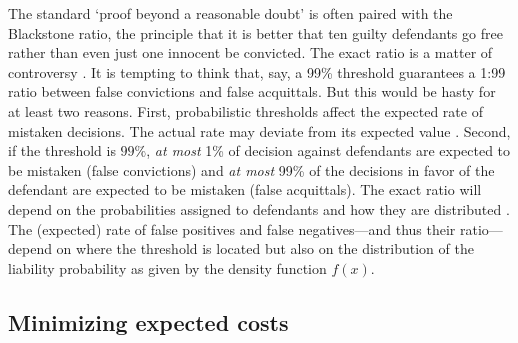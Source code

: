 \documentclass{article}
\begin{document}
 The standard
`proof beyond a reasonable doubt' is often paired with the Blackstone ratio, the principle that it is better that ten guilty defendants go free rather than even just one innocent be convicted. The exact ratio is a matter of controversy \citep{voloch1997}.
It is tempting to think that, say, a 99\% threshold guarantees a 1:99 ratio between false convictions and false acquittals. But this would be hasty for at least two reasons.
First, probabilistic thresholds affect the expected rate of mistaken decisions. The actual rate may deviate from its expected value \citep{Kaye1999Clarifying-the-}. Second, if the threshold is $99\%$, \textit{at most} 1\% of decision against defendants are expected to be mistaken (false convictions) and \textit{at most} 99\% of the decisions in favor of the defendant are expected to be mistaken (false acquittals). The exact ratio will depend on the probabilities  assigned to defendants and how they are distributed  \citep{allen2014}. The (expected) rate of false positives and false negatives---and thus their ratio---depend on where the threshold is located but also on the distribution of the liability probability  as given by the density function $f(x)$.







%
%
%

\subsection{Minimizing expected costs}
\end{document}

